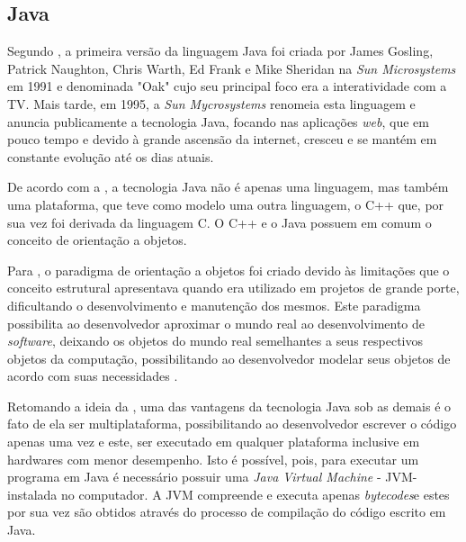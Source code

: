 \subsection{Java}

\par Segundo , a primeira versão da linguagem Java foi criada por James Gosling, Patrick Naughton, Chris Warth, Ed Frank e Mike Sheridan na \textit{Sun Microsystems} em 1991 e denominada "Oak" cujo seu principal foco era a interatividade com a TV. Mais tarde, em 1995, a \textit{Sun Mycrosystems} renomeia esta linguagem e anuncia publicamente a tecnologia Java, focando nas aplicações \textit{web}, que em pouco tempo e devido à grande ascensão da internet, cresceu e se mantém em constante evolução até os dias atuais.

\par De acordo com a , a tecnologia Java não é apenas uma linguagem, mas também uma plataforma, que teve como modelo uma outra linguagem, o C++ que, por sua vez foi derivada da linguagem C. O C++ e o Java possuem em comum o conceito de orientação a objetos.

\par Para , o paradigma de orientação a objetos foi criado devido às limitações que o conceito estrutural apresentava quando era utilizado em projetos de grande porte, dificultando o desenvolvimento e manutenção dos mesmos. Este paradigma possibilita ao desenvolvedor aproximar o mundo real ao desenvolvimento de \textit{software}, deixando os objetos do mundo real semelhantes a seus respectivos objetos da computação, possibilitando ao desenvolvedor modelar seus objetos de acordo com suas necessidades \cite{tcc_univas_faria_aspectj_programacao_orientada_aspecto_java}.

\par Retomando a ideia da , uma das vantagens da tecnologia Java sob as demais é o fato de ela ser multiplataforma, possibilitando ao desenvolvedor escrever o código apenas uma vez e este, ser executado em qualquer plataforma inclusive em hardwares com menor desempenho. Isto é possível, pois, para executar um programa em Java é necessário possuir uma \textit{Java Virtual Machine} - JVM\footnotemark[12] - instalada no computador. A JVM compreende e executa apenas \textit{bytecodes}\footnotemark[13] e estes por sua vez são obtidos através do processo de compilação do código escrito em Java.

